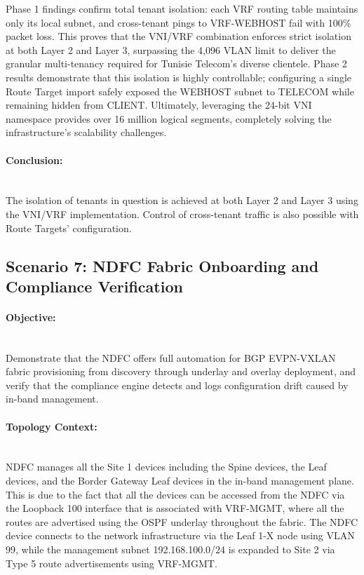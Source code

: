 Phase 1 findings confirm total tenant isolation: each VRF routing table maintains only its local subnet, and cross-tenant pings to VRF-WEBHOST fail with 100\% packet loss. This proves that the VNI/VRF combination enforces strict isolation at both Layer 2 and Layer 3, surpassing the 4,096 VLAN limit to deliver the granular multi-tenancy required for Tunisie Telecom's diverse clientele. Phase 2 results demonstrate that this isolation is highly controllable; configuring a single Route Target import safely exposed the WEBHOST subnet to TELECOM while remaining hidden from CLIENT. Ultimately, leveraging the 24-bit VNI namespace provides over 16 million logical segments, completely solving the infrastructure's scalability challenges.
\paragraph{Conclusion:}~\\
The isolation of tenants in question is achieved at both Layer 2 and Layer 3 using the VNI/VRF implementation. Control of cross-tenant traffic is also possible with Route Targets' configuration.

\subsection{Scenario 7: NDFC Fabric Onboarding and Compliance Verification}
\paragraph{Objective:}~\\
Demonstrate that the NDFC offers full automation for BGP EVPN-VXLAN fabric provisioning from discovery through underlay and overlay deployment, and verify that the compliance engine detects and logs configuration drift caused by in-band management.

\paragraph{Topology Context:}~\\
NDFC manages all the Site 1 devices including the Spine devices, the Leaf devices, and the Border Gateway Leaf devices in the in-band management plane. This is due to the fact that all the devices can be accessed from the NDFC via the Loopback 100 interface that is associated with VRF-MGMT, where all the routes are advertised using the OSPF underlay throughout the fabric. The NDFC device connects to the network infrastructure via the Leaf 1-X node using VLAN 99, while the management subnet 192.168.100.0/24 is expanded to Site 2 via Type 5 route advertisements using VRF-MGMT.

